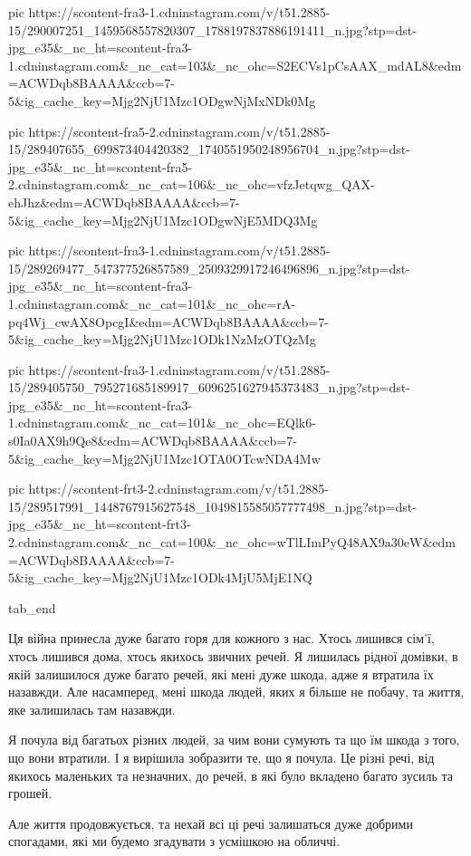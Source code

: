      pic https://scontent-fra3-1.cdninstagram.com/v/t51.2885-15/290007251_1459568557820307_1788197837886191411_n.jpg?stp=dst-jpg_e35&_nc_ht=scontent-fra3-1.cdninstagram.com&_nc_cat=103&_nc_ohc=S2ECVs1pCsAAX_mdAL8&edm=ACWDqb8BAAAA&ccb=7-5&ig_cache_key=Mjg2NjU1Mzc1ODgwNjMxNDk0Mg%

     pic https://scontent-fra5-2.cdninstagram.com/v/t51.2885-15/289407655_699873404420382_1740551950248956704_n.jpg?stp=dst-jpg_e35&_nc_ht=scontent-fra5-2.cdninstagram.com&_nc_cat=106&_nc_ohc=vfzJetqwg_QAX-ehJhz&edm=ACWDqb8BAAAA&ccb=7-5&ig_cache_key=Mjg2NjU1Mzc1ODgwNjE5MDQ3Mg%

     pic https://scontent-fra3-1.cdninstagram.com/v/t51.2885-15/289269477_547377526857589_2509329917246496896_n.jpg?stp=dst-jpg_e35&_nc_ht=scontent-fra3-1.cdninstagram.com&_nc_cat=101&_nc_ohc=rA-pq4Wj_cwAX8OpcgI&edm=ACWDqb8BAAAA&ccb=7-5&ig_cache_key=Mjg2NjU1Mzc1ODk1NzMzOTQzMg%

     pic https://scontent-fra3-1.cdninstagram.com/v/t51.2885-15/289405750_795271685189917_6096251627945373483_n.jpg?stp=dst-jpg_e35&_nc_ht=scontent-fra3-1.cdninstagram.com&_nc_cat=101&_nc_ohc=EQlk6-s0Ia0AX9h9Qe8&edm=ACWDqb8BAAAA&ccb=7-5&ig_cache_key=Mjg2NjU1Mzc1OTA0OTcwNDA4Mw%

     pic https://scontent-frt3-2.cdninstagram.com/v/t51.2885-15/289517991_1448767915627548_1049815585057777498_n.jpg?stp=dst-jpg_e35&_nc_ht=scontent-frt3-2.cdninstagram.com&_nc_cat=100&_nc_ohc=wTlLImPyQ48AX9a30eW&edm=ACWDqb8BAAAA&ccb=7-5&ig_cache_key=Mjg2NjU1Mzc1ODk4MjU5MjE1NQ%

  tab_end
\fi


Ця війна принесла дуже багато горя для кожного з нас. Хтось лишився сім'ї,
хтось лишився дома, хтось якихось звичних речей. Я лишилась рідної домівки, в
якій залишилося дуже багато речей, які мені дуже шкода, адже я втратила їх
назавжди. Але насамперед, мені шкода людей, яких я більше не побачу, та життя,
яке залишилась там назавжди.

Я почула від багатьох різних людей, за чим вони сумують та що їм шкода з того,
що вони втратили. І я вирішила зобразити те, що я почула. Це різні речі, від
якихось маленьких та незначних, до речей, в які було вкладено багато зусиль та
грошей.

Але життя продовжується, та нехай всі ці речі залишаться дуже добрими
спогадами, які ми будемо згадувати з усмішкою на обличчі.
